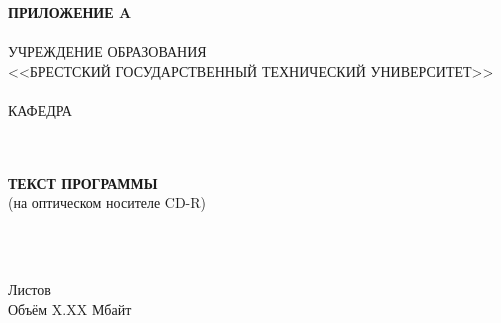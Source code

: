 \begin{center}
    \hspace{.6\textwidth}\textbf{ПРИЛОЖЕНИЕ A}\\
    \hspace{0pt}\\
    УЧРЕЖДЕНИЕ ОБРАЗОВАНИЯ\\
    <<БРЕСТСКИЙ ГОСУДАРСТВЕННЫЙ ТЕХНИЧЕСКИЙ УНИВЕРСИТЕТ>>\\
    \hspace{0pt}\\
    КАФЕДРА \titlePageKafedra\\
\end{center}

\vfill

\begin{center}
    \titlePageTopic\\
    \hspace{0pt}\\
    \textbf{ТЕКСТ ПРОГРАММЫ}\\
    (на оптическом носителе CD-R)
\end{center}

\vfill

\begin{center}
    \codeA\\
    \hspace{0pt}\\
    \begin{flushright}
        \begin{minipage}[t]{.5\textwidth}
            Листов \pageref{LastPage}\\
            Объём X.XX Мбайт
        \end{minipage}
    \end{flushright}
\end{center}

\vfill


